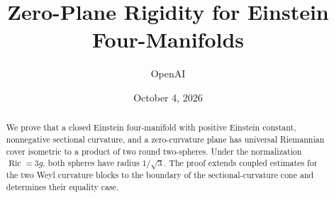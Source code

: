\documentclass[11pt]{article}
\title{Zero-Plane Rigidity for Einstein Four-Manifolds}
\author{OpenAI}
\date{October 4, 2026}
\theoremstyle{definition}
\theoremstyle{remark}
\begin{document}
\maketitle
\begin{abstract}
We prove that a closed Einstein four-manifold with positive Einstein constant, nonnegative sectional curvature, and a zero-curvature plane has universal Riemannian cover isometric to a product of two round two-spheres. Under the normalization $\operatorname{Ric}=3g$, both spheres have radius $1/\sqrt3$. The proof extends coupled estimates for the two Weyl curvature blocks to the boundary of the sectional-curvature cone and determines their equality case.
\end{abstract}

\clearpage
\begingroup
\small
\tableofcontents
\endgroup
\clearpage






\appendix

\clearpage

\end{document}
